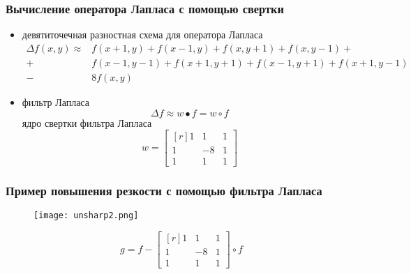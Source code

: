 \documentclass[
    12pt, 
    usepdftitle=false,
    aspectratio=1610
]{beamer}
\begin{document}
\begin{frame}
\frametitle{Вычисление оператора Лапласа с помощью свертки}
\begin{itemize}
     \item девятиточечная разностная схема для оператора Лапласа
    \begin{align*} 
        \Delta f(x,y)\approx &f(x+1,y)+f(x-1,y)+f(x,y+1)+f(x,y-1) +\\
                            +&f(x-1,y-1)+f(x+1,y+1)+f(x-1,y+1)+f(x+1,y-1)\\
                            -&8f(x,y)
    \end{align*}
    \item фильтр Лапласа
    $$
        \Delta f\approx
        w \bullet f = w \circ f
    $$
    ядро свертки фильтра Лапласа
    $$
        w =
        \begin{bmatrix*}[r]
            1 & 1 & 1 \\
            1 & -8 & 1 \\
            1 & 1 & 1
        \end{bmatrix*}
    $$
\end{itemize}
\end{frame}

\begin{frame}
\frametitle{Пример повышения резкости с помощью фильтра Лапласа}
\begin{figure}[t]
    \texttt{[image: unsharp2.png]}
\end{figure}
$$
    g = f -
    \begin{bmatrix*}[r]
        1 & 1 & 1 \\
        1 & -8 & 1 \\
        1 & 1 & 1
    \end{bmatrix*}
    \circ f
$$
\end{frame}
\end{document}
